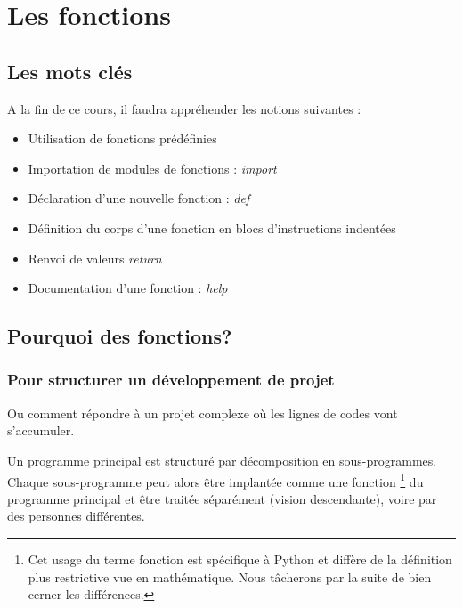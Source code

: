
\renewcommand{\lstlistingname}{Programme}
\chapter{Les fonctions}

\section{Les mots clés}
A la fin de ce cours, il faudra appréhender les notions suivantes :
\begin{itemize}
	\item Utilisation de fonctions prédéfinies
	\item Importation de modules de fonctions : \textit{import}
	\item Déclaration d'une nouvelle fonction :  \textit{def}
	\item Définition du corps d'une fonction en blocs d'instructions indentées
	\item Renvoi de valeurs \textit{return}
	\item Documentation d'une fonction : \textit{help}
\end{itemize}

\section{Pourquoi des fonctions?}

\subsection{Pour structurer un développement de projet}

Ou comment répondre à un projet complexe où les lignes de codes vont s'accumuler.

Un programme principal est structuré par décomposition  en sous-programmes. Chaque sous-programme peut alors être implantée comme une fonction \footnote{Cet usage du terme fonction est spécifique à Python et diffère de la définition plus restrictive vue en mathématique. Nous tâcherons par la suite de bien cerner les différences.} du programme principal et être traitée séparément (vision descendante), voire par des personnes différentes.


